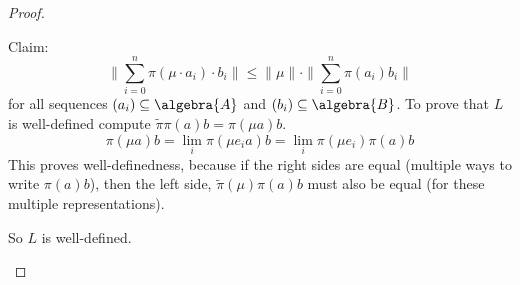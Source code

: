 \documentclass[a4paper]{article}
\begin{document}
\begin{proof}
\begin{enumerate}
		Claim:
		\begin{equation*}
			\| \sum_{i=0}^n \pi(\mu \cdot a_i) \cdot b_i \| \leq \|\mu \| \cdot \| \sum_{i=0}^n \pi(a_i) b_i \|
		\end{equation*}
		for all sequences $(a_i) \subseteq \algebra{A}$ and $(b_i) \subseteq \algebra{B}$.
		To prove that $L$ is well-defined compute $\tilde{\pi} \pi(a) b = \pi(\mu a) b$.
		\begin{equation*}
			\pi(\mu a) b = \lim_i \pi(\mu e_i a) b = \lim_i \pi(\mu e_i) \pi(a) b
		\end{equation*}
		This proves well-definedness, because if the right sides are equal (multiple ways to write $\pi(a)b$), then the left side, $\tilde{\pi}(\mu) \pi(a) b$ must also be equal (for these multiple representations).

		So $L$ is well-defined. 
	\end{enumerate}
\end{proof}
\end{document}
